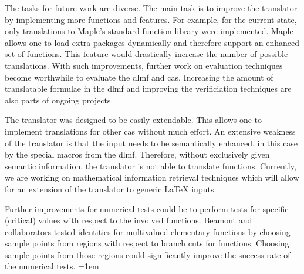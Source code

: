 \documentclass[a4paper,11pt]{article}
\newcommand{\Maple}{Maple}
\theoremstyle{defTheoStyle}
\theoremstyle{defExampStyle}
\begin{document}
The tasks for future work are diverse. The main task is to improve the translator by implementing more functions and features. For example, for the current state, only translations to \Maple's standard function library were implemented. \Maple{} allows one to load extra packages dynamically and therefore support an enhanced set of functions. This feature would drastically increase the number of possible translations. With such improvements, further work on evaluation techniques become worthwhile to evaluate the \gls*{dlmf} and \gls*{cas}.
Increasing the amount of translatable formulae in the \gls*{dlmf} and improving the verificiation 
techniques are also parts of ongoing projects. 

The translator was designed to be easily extendable. This allows one to implement translations for other \gls*{cas} without much effort.
An extensive weakness of the translator is that the input needs to be semantically enhanced, in this case by the special macros from the \gls*{dlmf}.
Therefore, without exclusively given semantic information, the translator is not able to translate functions. Currently, we are working on mathematical information retrieval techniques which will allow for an extension of the translator to generic \LaTeX{} inputs. 

Further improvements for numerical tests could be to perform tests for specific (critical) values \parencite{DBLP:journals/aaecc/BeaumontBDP07} with respect to the involved functions. Beamont and collaborators tested identities for multivalued elementary functions by choosing sample points from regions with respect to branch cuts for functions. Choosing sample points from those regions could significantly improve the success rate of the numerical tests.
\emergencystretch=1em
\printbibliography

\end{document}
